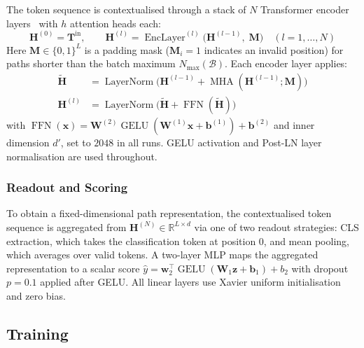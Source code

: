 \documentclass[runningheads]{llncs}
\begin{document}
The token sequence is contextualised through a stack of $N$
Transformer encoder layers~\cite{vaswani2017attention} with $h$ attention heads each:
\begin{equation}
  \mathbf{H}^{(0)} = \mathbf{T}^{\text{in}},\qquad
  \mathbf{H}^{(l)} = \operatorname{EncLayer}^{(l)}\bigl(\mathbf{H}^{(l-1)},\; \mathbf{M}\bigr)
  \quad (l = 1, \ldots, N)
  \label{eq:transformer}
\end{equation}
Here $\mathbf{M} \in \{0, 1\}^{L}$ is a padding mask ($\mathbf{M}_i = 1$ indicates an
invalid position) for paths shorter than the batch maximum $N_{\max}(\mathcal{B})$.
Each encoder layer applies:
\begin{align}
  \tilde{\mathbf{H}} &= \operatorname{LayerNorm}\bigl(
  \mathbf{H}^{(l-1)} + \operatorname{MHA}(\mathbf{H}^{(l-1)}; \mathbf{M})\bigr)
  \label{eq:attn}\\
  \mathbf{H}^{(l)} &= \operatorname{LayerNorm}\bigl(
  \tilde{\mathbf{H}} + \operatorname{FFN}(\tilde{\mathbf{H}})\bigr)
  \label{eq:ffn}
\end{align}
with $\operatorname{FFN}(\mathbf{x}) = \mathbf{W}^{(2)} \operatorname{GELU}(\mathbf{W}^{(1)} \mathbf{x} + \mathbf{b}^{(1)}) + \mathbf{b}^{(2)}$
and inner dimension $d'$, set to $2048$ in all runs.
GELU \cite{hendrycks2016gaussian} activation
and Post-LN layer normalisation are used throughout.

\subsubsection{Readout and Scoring}

\label{sec:readout}

To obtain a fixed-dimensional path representation, the contextualised token
sequence is aggregated from
$\mathbf{H}^{(N)} \in \mathbb{R}^{L \times d}$
via one of two readout strategies: CLS extraction, which takes the
classification token at position 0, and mean pooling, which averages
over valid tokens.
A two-layer MLP maps the aggregated representation to a scalar score
$\hat{y} = \mathbf{w}_2^{\top} \operatorname{GELU}(\mathbf{W}_1 \mathbf{z} + \mathbf{b}_1) + b_2$
with dropout $p = 0.1$ applied after GELU.
All linear layers use Xavier
uniform initialisation and zero bias.

\subsection{Training}

\label{sec:training}
\end{document}
